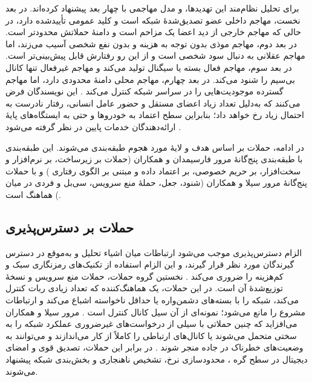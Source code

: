 \documentclass[12pt,a4paper]{article}
\begin{document}
برای تحلیل نظام‌مند این تهدیدها،  و  مدل مهاجمی با چهار بعد پیشنهاد کرده‌اند. در بعد نخست، مهاجم داخلی عضو تصدیق‌شدهٔ شبکه است و کلید عمومی تأییدشده دارد، در حالی که مهاجم خارجی از دید اعضا یک مزاحم است و دامنهٔ حملاتش محدودتر است. در بعد دوم، مهاجم موذی بدون توجه به هزینه و بدون نفع شخصی آسیب می‌زند، اما مهاجم عقلانی به دنبال سود شخصی است و از این رو رفتارش قابل پیش‌بینی‌تر است. در بعد سوم، مهاجم فعال بسته یا سیگنال تولید می‌کند و مهاجم غیرفعال تنها کانال بی‌سیم را شنود می‌کند. در بعد چهارم، مهاجم محلی دامنهٔ محدودی دارد، اما مهاجم گسترده موجودیت‌هایی را در سراسر شبکه کنترل می‌کند \cite{SecuringVehicularAd}. این نویسندگان فرض می‌کنند که به‌دلیل تعداد زیاد اعضای مستقل و حضور عامل انسانی، رفتار نادرست به احتمال زیاد رخ خواهد داد؛ بنابراین سطح اعتماد به خودرو‌ها و حتی به ایستگاه‌های پایهٔ ارائه‌دهندگان خدمات پایین در نظر گرفته می‌شود \cite{SecuringVehicularAd}.

در ادامه، حملات بر اساس هدف و لایهٔ مورد هجوم طبقه‌بندی می‌شوند. این طبقه‌بندی با طبقه‌بندی پنج‌گانهٔ مرور فارسیمدان و همکاران (حملات بر زیرساخت، بر نرم‌افزار و سخت‌افزار، بر حریم خصوصی، بر اعتماد داده و مبتنی بر الگوی رفتاری \cite{farsimadanReviewSecurityChallenges2025}) و با حملات پنج‌گانهٔ مرور سیلا و همکاران (شنود، جعل، حملهٔ منع سرویس، سی‌بل و فردی در میان \cite{VanetSecurityPrivacy}) هماهنگ است.

\subsection{حملات بر دسترس‌پذیری}

الزام دسترس‌پذیری موجب می‌شود ارتباطات میان اشیاء  تحلیل و به‌موقع در دسترس گیرندگان مورد نظر قرار گیرند، و این الزام استفاده از تکنیک‌های رمزنگاری سبک و کم‌هزینه را ضروری می‌کند \cite{farsimadanReviewSecurityChallenges2025}. نخستین گروه حملات، حملات منع سرویس  و نسخهٔ توزیع‌شدهٔ آن است. در این حملات، یک هماهنگ‌کننده که تعداد زیادی ربات کنترل می‌کند، شبکه را با بسته‌های دشمن‌واره یا حداقل ناخواسته اشباع می‌کند \cite{farsimadanReviewSecurityChallenges2025} و ارتباطات مشروع را مانع می‌شود؛ نمونه‌ای از آن سیل کانال کنترل است \cite{farsimadanReviewSecurityChallenges2025}. مرور سیلا و همکاران می‌افزاید که چنین حملاتی با سیلی از درخواست‌های غیرضروری عملکرد شبکه را به سختی متحمل می‌شوند یا کانال‌های ارتباطی را کاملاً از کار می‌اندازند و می‌توانند به وضعیت‌های خطرناک در جاده منجر شوند \cite{VanetSecurityPrivacy}. در برابر این حملات، تصدیق قوی و امضای دیجیتال در سطح گره \cite{farsimadanReviewSecurityChallenges2025}، محدودسازی نرخ، تشخیص ناهنجاری و بخش‌بندی شبکه \cite{VanetSecurityPrivacy} پیشنهاد می‌شوند.
\end{document}
